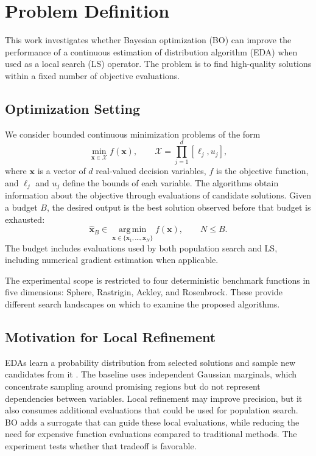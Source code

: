 \section{Problem Definition}

This work investigates whether Bayesian optimization (BO) can improve the
performance of a continuous estimation of distribution algorithm (EDA) when
used as a local search (LS) operator. The problem is to find high-quality solutions
within a fixed number of objective evaluations.

\subsection{Optimization Setting}

We consider bounded continuous minimization problems of the form
\begin{equation}
    \min_{\mathbf{x} \in \mathcal{X}} f(\mathbf{x}),
    \qquad
    \mathcal{X} = \prod_{j=1}^{d} [\ell_j,u_j],
\end{equation}
where $\mathbf{x}$ is a vector of $d$ real-valued decision variables,
$f$ is the objective function, and $\ell_j$ and $u_j$ define the bounds of
each variable. The algorithms obtain information about the objective through
evaluations of candidate solutions. Given a budget $B$, the desired output
is the best solution observed before that budget is exhausted:
\begin{equation}
    \hat{\mathbf{x}}_B \in
    \operatorname*{arg\,min}_{\mathbf{x} \in \{\mathbf{x}_1,\ldots,
    \mathbf{x}_{N}\}} f(\mathbf{x}), \qquad N \leq B.
\end{equation}
The budget includes evaluations used by both population search and LS, including numerical gradient estimation when applicable.

The experimental scope is restricted to four deterministic benchmark
functions in five dimensions: Sphere, Rastrigin, Ackley, and Rosenbrock.
These provide different search landscapes on which to examine the proposed
algorithms.

\subsection{Motivation for Local Refinement}

EDAs learn a probability distribution from selected solutions and sample new candidates from it \cite{larranaga2002eda}. The baseline uses independent Gaussian marginals, which concentrate sampling around promising regions but do not represent dependencies between variables. Local refinement may improve precision, but it also consumes additional evaluations that could be used for population search. BO adds a surrogate that can guide these local evaluations, while reducing the need for expensive function evaluations compared to traditional methods. The experiment tests whether that tradeoff is favorable.

